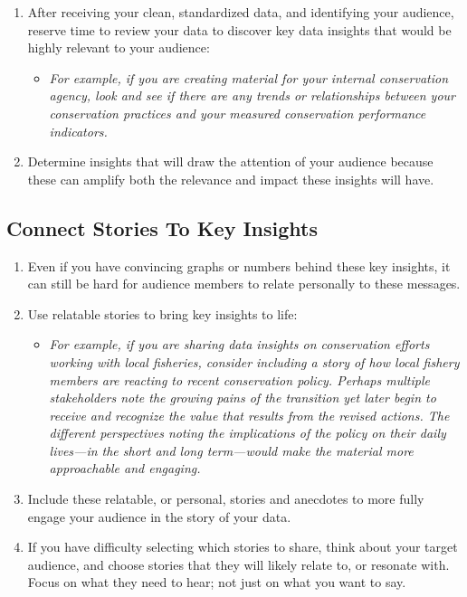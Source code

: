 \documentclass[
]{book}
\providecommand{\tightlist}{%
  \setlength{\itemsep}{0pt}\setlength{\parskip}{0pt}}
\begin{document}
\begin{enumerate}
\def\labelenumi{\arabic{enumi}.}
\tightlist
\item
  After receiving your clean, standardized data, and identifying your audience, reserve time to review your data to discover key data insights that would be highly relevant to your audience:

  \begin{itemize}
  \tightlist
  \item
    \emph{For example, if you are creating material for your internal conservation agency, look and see if there are any trends or relationships between your conservation practices and your measured conservation performance indicators.}
  \end{itemize}
\item
  Determine insights that will draw the attention of your audience because these can amplify both the relevance and impact these insights will have.
\end{enumerate}

\hypertarget{connect-stories-to-key-insights}{%
\subsection{Connect Stories To Key Insights}\label{connect-stories-to-key-insights}}

\begin{enumerate}
\def\labelenumi{\arabic{enumi}.}
\tightlist
\item
  Even if you have convincing graphs or numbers behind these key insights, it can still be hard for audience members to relate personally to these messages.
\item
  Use relatable stories to bring key insights to life:

  \begin{itemize}
  \tightlist
  \item
    \emph{For example, if you are sharing data insights on conservation efforts working with local fisheries, consider including a story of how local fishery members are reacting to recent conservation policy. Perhaps multiple stakeholders note the growing pains of the transition yet later begin to receive and recognize the value that results from the revised actions. The different perspectives noting the implications of the policy on their daily lives---in the short and long term---would make the material more approachable and engaging.}
  \end{itemize}
\item
  Include these relatable, or personal, stories and anecdotes to more fully engage your audience in the story of your data.
\item
  If you have difficulty selecting which stories to share, think about your target audience, and choose stories that they will likely relate to, or resonate with. Focus on what they need to hear; not just on what you want to say.
\end{enumerate}
\end{document}
